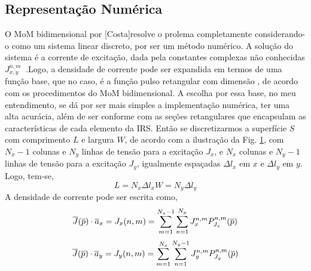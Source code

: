 \documentclass[
	12pt,				%
	openright,			%
	oneside,			%
	a4paper,			%
	english,			%
	brazil				%
	]{abntex2}
\begin{document}
\begin{apendicesenv}
\subsection{ Representação Numérica}
O MoM  bidimensional por [Costa]resolve o prolema completamente considerando-o como um sistema linear discreto, por ser um método numérico.  A solução do sistema é a corrente de excitação, dada pela constantes complexas não conhecidas $J_{x,y}^{n,m} \ $ .Logo, a densidade de corrente pode ser expandida em termos de uma função base, que no caso, é a função pulso retangular com dimensão , de acordo com os procedimentos do MoM bidimensional. A escolha por essa base, no meu entendimento, se dá por ser mais simples a implementação numérica, ter uma alta acurácia, além de ser conforme com as seções retangulares que encapsulam as características de cada elemento da IRS. Então se discretizarmos a superfície $S$  com comprimento $L$  e largura $W$, de acordo com a ilustração da Fig. \ref{DiscretizaçãoXY}, com $N_x-1$ colunas e $N_y$ linhas de tensão para a excitação $J_x$, e $N_x$ colunas e $N_y-1$ linhas de tensão para a excitação $J_y$, igualmente espaçadas $\Delta l_x$  em $x$ e $\Delta l_y$ em $y$.  Logo, tem-se,
\begin{subequations}
    \begin{equation}
    L=N_x {\Delta l}_x
\end{equation}
  \begin{equation}
    W=N_y {\Delta l}_y
\end{equation}
\end{subequations}
A densidade de corrente pode ser escrita como,
\begin{equation}{\label{ExpansãoJx}}
    \overline{J}(\overline{p}) \cdot \overline{a}_x=J_x(n,m)=\sum_{m=1}^{N_x-1}\sum_{n=1}^{N_y} J_{x}^{n,m}P_{J_x}^{n,m}(\overline{p})
\end{equation}
\begin{equation}{\label{ExpansãoJy}}
    \overline{J}(\overline{p}) \cdot \overline{a}_y=J_y(n,m)=
\sum_{m=1}^{N_x}\sum_{n=1}^{N_y-1} J_{y}^{n,m}P_{J_y}^{n,m} (\overline{p})   
\end{equation}

\begin{figure}[htb]
 \label{DiscretizaçãoXY}



\end{figure}
\end{apendicesenv}
\end{document}

